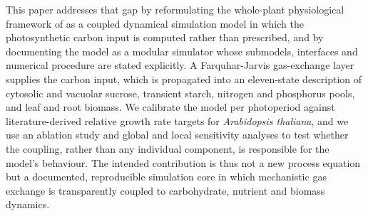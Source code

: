 \documentclass[a4paper,fleqn]{cas-sc}
\begin{document}
This paper addresses that gap by reformulating the whole-plant physiological framework of \citet{Tedone2020} as a coupled dynamical simulation model in which the photosynthetic carbon input is computed rather than prescribed, and by documenting the model as a modular simulator whose submodels, interfaces and numerical procedure are stated explicitly. A Farquhar-Jarvis gas-exchange layer supplies the carbon input, which is propagated into an eleven-state description of cytosolic and vacuolar sucrose, transient starch, nitrogen and phosphorus pools, and leaf and root biomass. We calibrate the model per photoperiod against literature-derived relative growth rate targets for \textit{Arabidopsis thaliana}, and we use an ablation study and global and local sensitivity analyses to test whether the coupling, rather than any individual component, is responsible for the model's behaviour. The intended contribution is thus not a new process equation but a documented, reproducible simulation core in which mechanistic gas exchange is transparently coupled to carbohydrate, nutrient and biomass dynamics.
\end{document}

